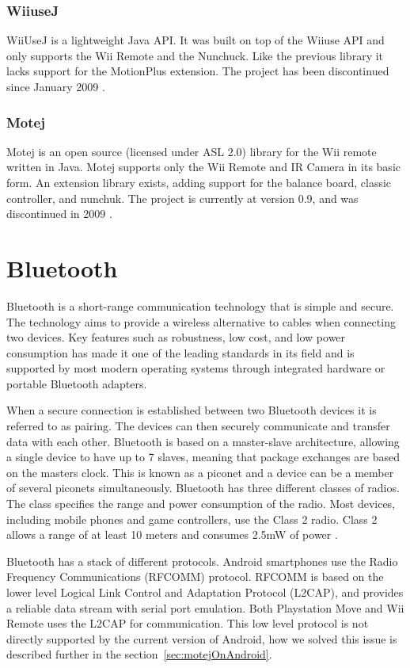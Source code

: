 \subsubsection{WiiuseJ}
WiiUseJ is a lightweight Java API. It was built on top of the Wiiuse API and only supports the Wii Remote and the Nunchuck. Like the previous library it lacks support for the MotionPlus extension. The project has been discontinued since January 2009 \cite{Wiiusej}.

\subsubsection{Motej}
Motej is an open source (licensed under ASL 2.0) library for the Wii remote written in Java. Motej supports only the Wii Remote and IR Camera in its basic form. An extension library exists, adding support for the balance board, classic controller, and nunchuk. The project is currently at version 0.9, and was discontinued in 2009 \cite{Motej}.

\section{Bluetooth}
Bluetooth is a short-range communication technology that is simple and secure. The technology aims to provide a wireless alternative to cables when connecting two devices. Key features such as robustness, low cost, and low power consumption has made it one of the leading standards in its field and is supported by most modern operating systems through integrated hardware or portable Bluetooth adapters.

When a secure connection is established between two Bluetooth devices it is referred to as pairing. The devices can then securely communicate and transfer data with each other. Bluetooth is based on a master-slave architecture, allowing a single device to have up to 7 slaves, meaning that package exchanges are based on the masters clock. This is known as a piconet and a device can be a member of several piconets simultaneously. Bluetooth has three different classes of radios. The class specifies the range and power consumption of the radio. Most devices, including mobile phones and game controllers, use the Class 2 radio. Class 2 allows a range of at least 10 meters and consumes 2.5mW of power \cite{bluetooth}.

Bluetooth has a stack of different protocols. Android smartphones use the Radio Frequency Communications (RFCOMM) protocol. RFCOMM is based on the lower level Logical Link Control and Adaptation Protocol (L2CAP), and provides a reliable data stream with serial port emulation. Both Playstation Move and Wii Remote uses the L2CAP for communication. This low level protocol is not directly supported by the current version of Android, how we solved this issue is described further in the section~\ref{sec:motejOnAndroid}.